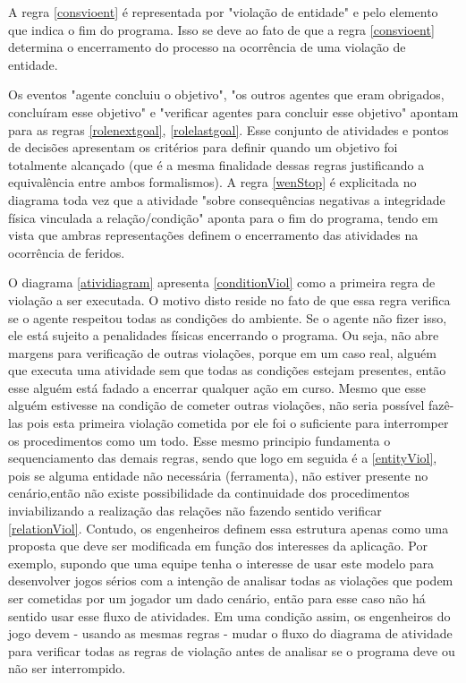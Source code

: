 A regra \ref{consvioent} é representada por "violação de entidade" e pelo elemento que indica o fim do programa. Isso se deve ao fato de que a regra \ref{consvioent} determina o encerramento do processo na ocorrência de uma violação de entidade. 

Os eventos "agente concluiu o objetivo", "os outros agentes que eram obrigados, concluíram esse objetivo" e "verificar agentes para concluir esse objetivo" apontam para as regras \ref{rolenextgoal}, \ref{rolelastgoal}. Esse conjunto de atividades e pontos de decisões apresentam os critérios para definir quando um objetivo foi totalmente alcançado (que é a mesma finalidade dessas regras justificando a equivalência entre ambos formalismos).  A regra \ref{wenStop} é explicitada no diagrama toda vez que a atividade "sobre consequências negativas a integridade física vinculada  a relação/condição" aponta para o fim do programa, tendo em vista que ambras representações definem o encerramento das atividades na ocorrência de feridos. 

O diagrama \ref{atividiagram} apresenta \ref{conditionViol} como a primeira regra de violação a ser executada. O motivo disto reside no fato de que essa regra verifica se o agente respeitou todas as condições do ambiente. Se o agente não fizer isso, ele está sujeito a penalidades físicas encerrando o programa. Ou seja, não abre margens para verificação de outras violações, porque em um caso real, alguém que executa uma atividade sem que todas as condições estejam presentes, então esse alguém está fadado a encerrar qualquer ação em curso. Mesmo que esse alguém estivesse na condição de cometer outras violações, não seria possível fazê-las pois esta primeira violação cometida por ele foi o suficiente para interromper os procedimentos como um todo. Esse mesmo principio fundamenta o sequenciamento das demais regras, sendo que logo em seguida é a \ref{entityViol}, pois se alguma entidade não necessária (ferramenta), não estiver presente no cenário,então não existe possibilidade da continuidade dos procedimentos inviabilizando a realização das relações não fazendo sentido verificar \ref{relationViol}. Contudo, os engenheiros definem essa estrutura apenas como uma proposta que deve ser modificada em função dos interesses da aplicação. Por exemplo, supondo que uma equipe tenha o interesse de usar este modelo para desenvolver jogos sérios com a intenção de analisar todas as violações que podem ser cometidas por um jogador um dado cenário, então para esse caso não há sentido usar esse fluxo de atividades. Em uma condição assim, os engenheiros do jogo devem - usando as mesmas regras - mudar o fluxo do diagrama de atividade para verificar todas as regras de violação antes de analisar se o programa deve ou não ser interrompido.